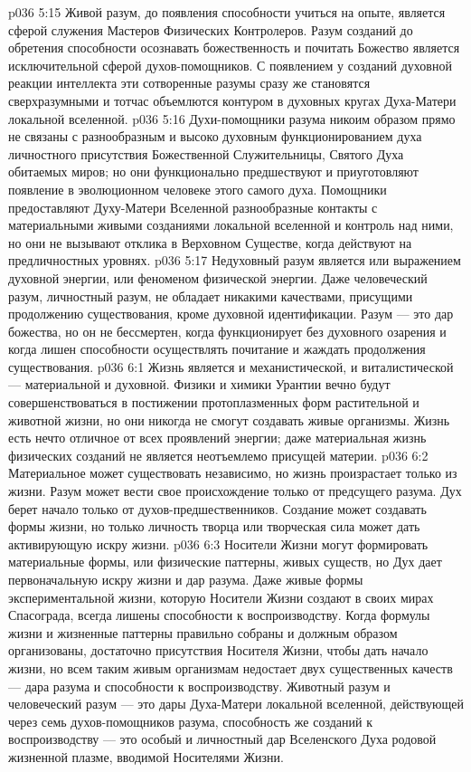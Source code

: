 \vs p036 5:15 Живой разум, до появления способности учиться на опыте, является сферой служения Мастеров Физических Контролеров. Разум созданий до обретения способности осознавать божественность и почитать Божество является исключительной сферой духов\hyp{}помощников. С появлением у созданий духовной реакции интеллекта эти сотворенные разумы сразу же становятся сверхразумными и тотчас объемлются контуром в духовных кругах Духа\hyp{}Матери локальной вселенной.
\vs p036 5:16 Духи\hyp{}помощники разума никоим образом прямо не связаны с разнообразным и высоко духовным функционированием духа личностного присутствия Божественной Служительницы, Святого Духа обитаемых миров; но они функционально предшествуют и приуготовляют появление в эволюционном человеке этого самого духа. Помощники предоставляют Духу\hyp{}Матери Вселенной разнообразные контакты с материальными живыми созданиями локальной вселенной и контроль над ними, но они не вызывают отклика в Верховном Существе, когда действуют на предличностных уровнях.
\vs p036 5:17 \pc Недуховный разум является или выражением духовной энергии, или феноменом физической энергии. Даже человеческий разум, личностный разум, не обладает никакими качествами, присущими продолжению существования, кроме духовной идентификации. Разум --- это дар божества, но он не бессмертен, когда функционирует без духовного озарения и когда лишен способности осуществлять почитание и жаждать продолжения существования.
\vs p036 6:1 Жизнь является и механистической, и виталистической --- материальной и духовной. Физики и химики Урантии вечно будут совершенствоваться в постижении протоплазменных форм растительной и животной жизни, но они никогда не смогут создавать живые организмы. Жизнь есть нечто отличное от всех проявлений энергии; даже материальная жизнь физических созданий не является неотъемлемо присущей материи.
\vs p036 6:2 Материальное может существовать независимо, но жизнь произрастает только из жизни. Разум может вести свое происхождение только от предсущего разума. Дух берет начало только от духов\hyp{}предшественников. Создание может создавать формы жизни, но только личность творца или творческая сила может дать активирующую искру жизни.
\vs p036 6:3 Носители Жизни могут формировать материальные формы, или физические паттерны, живых существ, но Дух дает первоначальную искру жизни и дар разума. Даже живые формы экспериментальной жизни, которую Носители Жизни создают в своих мирах Спасограда, всегда лишены способности к воспроизводству. Когда формулы жизни и жизненные паттерны правильно собраны и должным образом организованы, достаточно присутствия Носителя Жизни, чтобы дать начало жизни, но всем таким живым организмам недостает двух существенных качеств --- дара разума и способности к воспроизводству. Животный разум и человеческий разум --- это дары Духа\hyp{}Матери локальной вселенной, действующей через семь духов\hyp{}помощников разума, способность же созданий к воспроизводству --- это особый и личностный дар Вселенского Духа родовой жизненной плазме, вводимой Носителями Жизни.
